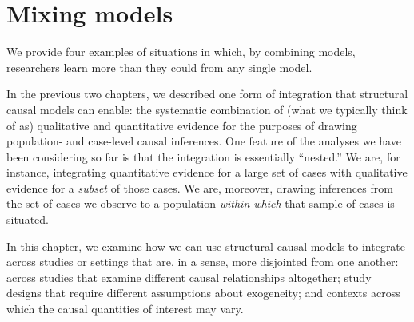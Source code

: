 \documentclass[
  12pt,
]{book}
\newenvironment{headerbox}{
  \definecolor{shadecolor}{rgb}{0.8, 0.8, 0.8}  %
  \color{black}
  \begin{shaded}}{\end{shaded}}
\begin{document}
\hypertarget{mm}{%
\chapter{Mixing models}\label{mm}}

\begin{headerbox}
We provide four examples of situations in which, by combining models, researchers learn more than they could from any single model.

\end{headerbox}

In the previous two chapters, we described one form of integration that structural causal models can enable: the systematic combination of (what we typically think of as) qualitative and quantitative evidence for the purposes of drawing population- and case-level causal inferences. One feature of the analyses we have been considering so far is that the integration is essentially ``nested.'' We are, for instance, integrating quantitative evidence for a large set of cases with qualitative evidence for a \emph{subset} of those cases. We are, moreover, drawing inferences from the set of cases we observe to a population \emph{within which} that sample of cases is situated.

In this chapter, we examine how we can use structural causal models to integrate across studies or settings that are, in a sense, more disjointed from one another: across studies that examine different causal relationships altogether; study designs that require different assumptions about exogeneity; and contexts across which the causal quantities of interest may vary.
\end{document}

